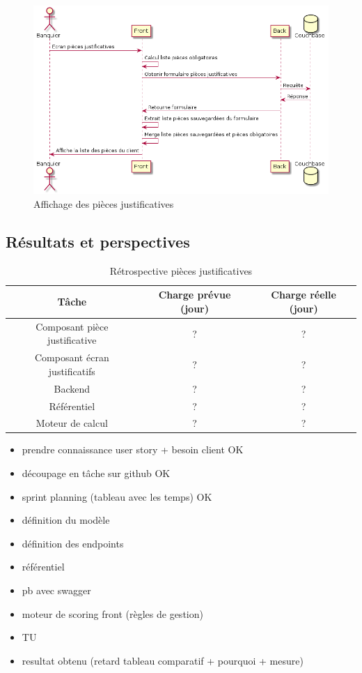 \begin{figure}[h!]
	\includegraphics[scale=0.55]{images/travailBP1818/piecesJustif/seqGet.png}
	\centering
	\caption{Affichage des pièces justificatives}
	\label{seqGet}
\end{figure}

\subsection{Résultats et perspectives}

\begin{table}[h!]
	\center
	\begin{tabular}{| c | c | c |}
     \hline
     Tâche & Charge prévue (jour) & Charge réelle (jour) \\ \hline
     Composant pièce justificative & ? & ?\\ \hline
     Composant écran justificatifs & ? & ?\\ \hline
     Backend & ? & ?\\ \hline
     Référentiel & ? & ?\\ \hline
     Moteur de calcul & ? & ?\\
     \hline
	\end{tabular}
	\caption{Rétrospective pièces justificatives}
	\label{retroPJ}
\end{table}
	
	
	\newpage
\begin{itemize}
	\item prendre connaissance user story + besoin client OK
	\item découpage en tâche sur github OK
	\item sprint planning (tableau avec les temps) OK
	\item définition du modèle
	\item définition des endpoints
	\item référentiel
	\item pb avec swagger
	\item moteur de scoring front (règles de gestion)
	\item TU
	\item resultat obtenu (retard tableau comparatif + pourquoi + mesure)
\end{itemize}